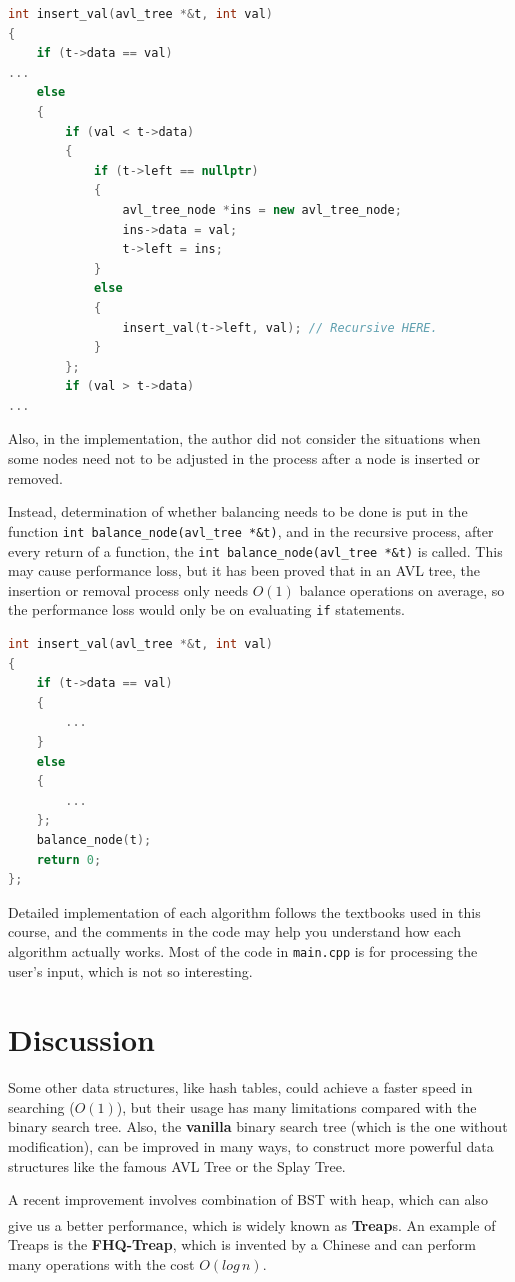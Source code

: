 \documentclass[cn,black,12pt,normal]{elegantnote}
\newcommand{\uct}[1]{\textsuperscript{\textsuperscript{\cite{#1}}}}
\begin{document}
\begin{lstlisting}[language = C++]
int insert_val(avl_tree *&t, int val)
{
	if (t->data == val)
...
	else
	{
		if (val < t->data)
		{
			if (t->left == nullptr)
			{
				avl_tree_node *ins = new avl_tree_node;
				ins->data = val;
				t->left = ins;
			}
			else
			{
				insert_val(t->left, val); // Recursive HERE.
			}
		};
		if (val > t->data)
...
\end{lstlisting}

Also, in the implementation, the author did not consider the situations when some nodes need not to be adjusted in the process after a node is inserted or removed. 

Instead, determination of whether balancing needs to be done is put in the function \lstinline{int balance_node(avl_tree *&t)}, and in the recursive process, after every return of a function, the \lstinline{int balance_node(avl_tree *&t)} is called. This may cause performance loss, but it has been proved that in an AVL tree, the insertion or removal process only needs $O(1)$ balance operations on average, so the performance loss would only be on evaluating \lstinline{if} statements.

\begin{lstlisting}[language = C++]
int insert_val(avl_tree *&t, int val)
{
	if (t->data == val)
	{
        ...
	}
	else
	{
        ...
	};
	balance_node(t);
	return 0;
};
\end{lstlisting}

Detailed implementation of each algorithm follows the textbooks used in this course, and the comments in the code may help you understand how each algorithm actually works. Most of the code in \lstinline{main.cpp} is for processing the user's input, which is not so interesting.

\section{Discussion}

Some other data structures, like hash tables, could achieve a faster speed in searching ($O(1)$), but their usage has many limitations compared with the binary search tree. Also, the \textbf{vanilla} binary search tree (which is the one without modification), can be improved in many ways, to construct more powerful data structures like the famous AVL Tree or the Splay Tree.

A recent improvement involves combination of BST with heap, which can also give us a better performance, which is widely known as \textbf{Treap}s.\uct{yi2005research} An example of Treaps is the \textbf{FHQ-Treap}, which is invented by a Chinese and can perform many operations with the cost $O(log\, n)$.

\newpage

\end{document}
